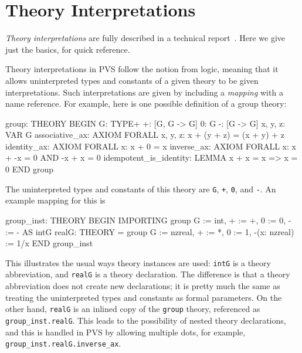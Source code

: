 \chapter{Theory Interpretations}\label{interpretations}
 \emph{Theory interpretations} are fully
described in a technical report~\cite{PVS:interpretations}.  Here we give
just the basics, for quick reference.

Theory interpretations in PVS follow the notion from logic, meaning that
it allows uninterpreted types and constants of a given theory to be given
interpretations.  Such interpretations are given by including a
\emph{mapping} with a name reference.  For example, here is
one possible definition of a group theory:
\begin{pvsex}
 group: THEORY
  BEGIN
  G: TYPE+
  +: [G, G -> G]
  0: G
  -: [G -> G]
  x, y, z: VAR G
  associative_ax: AXIOM FORALL x, y, z: x + (y + z) = (x + y) + z
  identity_ax: AXIOM FORALL x: x + 0 = x
  inverse_ax: AXIOM FORALL x: x + -x = 0 AND -x + x = 0
  idempotent_is_identity: LEMMA x + x = x => x = 0
 END group
\end{pvsex}
The uninterpreted types and constants of this theory are \texttt{G},
\texttt{+}, \texttt{0}, and \texttt{-}.  An example mapping for this is
\begin{pvsex}
group_inst: THEORY
BEGIN
 IMPORTING group{{ G := int, + := +, 0 := 0, - := - }} AS intG
 realG: THEORY = group{{ G := nzreal, + := *, 0 := 1, -(x: nzreal) := 1/x }}
END group_inst
\end{pvsex}

This illustrates the usual ways theory instances are used: \texttt{intG} is a
theory abbreviation, and \texttt{realG} is a theory declaration.  The
difference is that a theory abbreviation does not create new declarations;
it is pretty much the same as treating the uninterpreted types and
constants as formal parameters.  On the other hand, \texttt{realG} is an
inlined copy of the \texttt{group} theory, referenced as
\texttt{group\_inst.realG}.  This leads to the possibility of nested
theory declarations, and this is handled in PVS by allowing multiple dots,
for example, \texttt{group\_inst.realG.inverse\_ax}.



